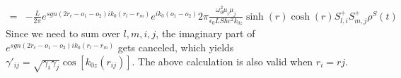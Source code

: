 \documentclass[aps,showpacs,twocolumn,twoside,groupedaddress]{revtex4}
\begin{document}
\begin{widetext}
\begin{equation}
\begin{split}
=&-\frac{L}{2\pi}e^{sgn(2r_{c}-o_{1}-o_{2})ik_{0}(r_{l}-r_{m})}e^{ik_{0}(o_{1}-o_{2})}2\pi\frac{\omega_{0}^{2}\mu_{i}\mu_{j}}{\epsilon_{0}LS\hbar c^{2}k_{0z}}\sinh(r)\cosh(r)S_{l,i}^{+}S_{m,j}^{+}\rho^{S}(t)
\end{split}
\end{equation}
Since we need to sum over $l,m,i,j$, the imaginary part of $e^{sgn(2r_{c}-o_{1}-o_{2})ik_{0}(r_{l}-r_{m})}$ gets canceled, which yields $\gamma'_{ij}=\sqrt{\gamma_{i}\gamma_{j}}\cos[k_{0z}(r_{ij})]$. The above calculation is also valid when $r_i=rj$.

\end{widetext}




\end{document}

